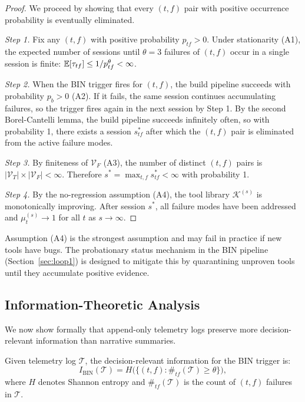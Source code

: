 \begin{proof}
We proceed by showing that every $(t,f)$ pair with positive occurrence
probability is eventually eliminated.

\textit{Step 1.} Fix any $(t, f)$ with positive probability $p_{tf} > 0$.
Under stationarity (A1), the expected number of sessions until $\theta = 3$
failures of $(t, f)$ occur in a single session is finite:
$\operatorname{\mathbb{E}}[\tau_{tf}] \leq 1 / p_{tf}^\theta < \infty$.

\textit{Step 2.} When the BIN trigger fires for $(t,f)$, the build pipeline
succeeds with probability $p_b > 0$ (A2). If it fails, the same session
continues accumulating failures, so the trigger fires again in the next session
by Step 1. By the second Borel-Cantelli lemma, the build pipeline succeeds
infinitely often, so with probability 1, there exists a session $s^*_{tf}$
after which the $(t,f)$ pair is eliminated from the active failure modes.

\textit{Step 3.} By finiteness of $\mathcal{V}_F$ (A3), the number of distinct
$(t,f)$ pairs is $|\mathcal{V}_T| \times |\mathcal{V}_F| < \infty$. Therefore
$s^* = \max_{t,f} s^*_{tf} < \infty$ with probability 1.

\textit{Step 4.} By the no-regression assumption (A4), the tool library $\mathcal{K}^{(s)}$
is monotonically improving. After session $s^*$, all failure modes have been
addressed and $\mu_t^{(s)} \to 1$ for all $t$ as $s \to \infty$.
\end{proof}

\begin{remark}
Assumption (A4) is the strongest assumption and may fail in practice if new
tools have bugs. The probationary status mechanism in the BIN pipeline
(Section~\ref{sec:loop1}) is designed to mitigate this by quarantining
unproven tools until they accumulate positive evidence.
\end{remark}

\subsection{Information-Theoretic Analysis}
\label{sec:info_theory}

We now show formally that append-only telemetry logs preserve more
decision-relevant information than narrative summaries.

\begin{definition}
\label{def:relevant_info}
Given telemetry log $\mathcal{T}$, the decision-relevant information for the
BIN trigger is:
\begin{equation}
I_{\text{BIN}}(\mathcal{T}) = H\bigl(\{(t,f) : \#_{tf}(\mathcal{T}) \geq \theta\}\bigr),
\end{equation}
where $H$ denotes Shannon entropy and $\#_{tf}(\mathcal{T})$ is the count of
$(t,f)$ failures in $\mathcal{T}$.
\end{definition}

